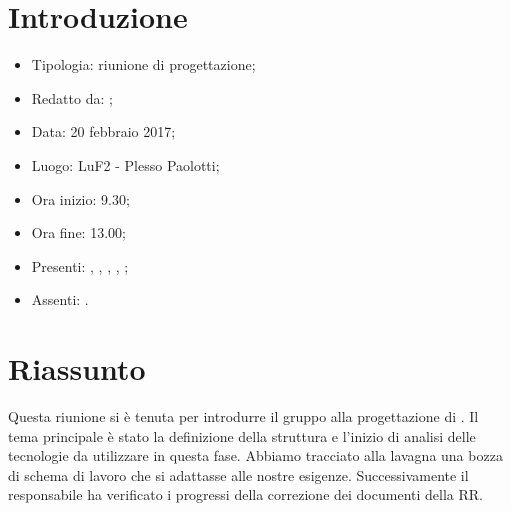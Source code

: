 \section{Introduzione}

	\begin{itemize}
		\item Tipologia: riunione di progettazione;
		\item Redatto da: \MC;
		\item Data: 20 febbraio 2017;
		\item Luogo: LuF2 - Plesso Paolotti;
		\item Ora inizio: 9.30;
		\item Ora fine: 13.00;
		\item Presenti: \AS, \DAN, \DS, \MC, \NS;
		\item Assenti: \AN.	
			
	\end{itemize}

\section{Riassunto}
Questa riunione si è tenuta per introdurre il gruppo alla progettazione di \progetto. Il tema principale è stato la definizione della struttura e l'inizio di analisi delle tecnologie da utilizzare in questa fase. Abbiamo tracciato alla lavagna una bozza di schema di lavoro che si adattasse alle nostre esigenze. Successivamente il responsabile ha verificato i progressi della correzione dei documenti della RR.